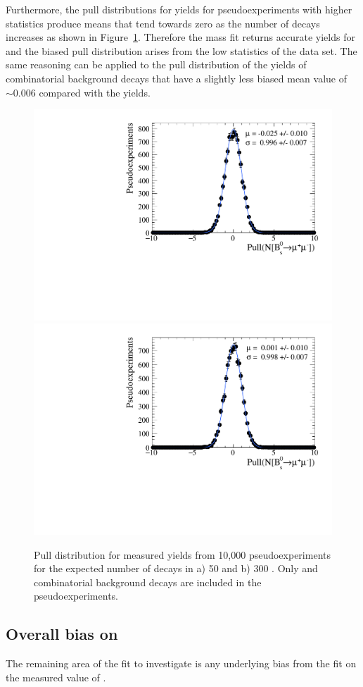 Furthermore, the pull distributions for \bsmumu yields for pseudoexperiments with higher statistics produce means that tend towards zero as the number of decays increases as shown in Figure~\ref{fig:BsmumuYieldPulls}. %
Therefore the mass fit returns accurate yields for \bsmumu and the biased pull distribution arises from the low statistics of the data set. The same reasoning can be applied to the pull distribution of the yields of combinatorial background decays that have a slightly less biased mean value of $\sim0.006$ compared with the \bsmumu yields.

\begin{figure}[tbp]
    \centering
        \includegraphics[width=0.49 \textwidth]{./Figs/LifetimeSystematics/Bs2MuMu_yield_pull_50fb.pdf}
        \includegraphics[width=0.49 \textwidth]{./Figs/LifetimeSystematics/Bs2MuMu_yield_pull_300fb.pdf}
    \caption{Pull distribution for \bsmumu measured yields from 10,000 pseudoexperiments for the expected number of decays in a) 50 and b) 300 \fb. Only \bsmumu and combinatorial background decays are included in the pseudoexperiments.}
    \label{fig:BsmumuYieldPulls}
\end{figure}


\subsection[Overall bias on \tmumu]{Overall bias on \boldmath{\tmumu}}
The remaining area of the fit to investigate is any underlying bias from the fit on the measured value of \tmumu. %

